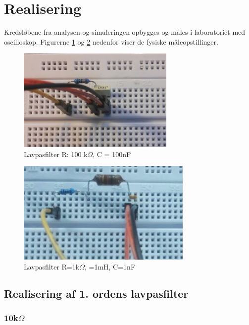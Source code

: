 \section{Realisering}
Kredsløbene fra analysen og simuleringen opbygges og måles i laboratoriet med oscilloskop. Figurerne \ref{Rea_1_100} og \ref{Rea_2_1} nedenfor viser de fysiske måleopstillinger. 

\begin{figure}[h!]
\begin{center}
\includegraphics[height=5cm]{E_Fig/Rea_1_100}
\caption{Lavpasfilter R: 100 k$\Omega$, C = 100nF}
\label{Rea_1_100}
\end{center}
\end{figure}

\begin{figure}[h!]
\begin{center}
\includegraphics[height=5cm]{E_Fig/Rea_2_1}
\caption{Lavpasfilter R=1k$\Omega$, =1mH, C=1nF}
\label{Rea_2_1}
\end{center}
\end{figure}

\newpage
\subsection{Realisering af 1. ordens lavpasfilter}


\subsubsection{10k$\Omega$}

